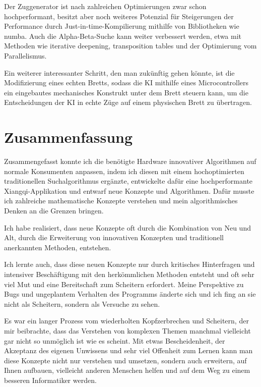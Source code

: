\documentclass{jpp}
\begin{document}
Der Zuggenerator ist nach zahlreichen Optimierungen zwar schon hochperformant, besitzt aber noch weiteres Potenzial für Steigerungen der Performance durch Just-in-time-Kompilierung mithilfe von Bibliotheken wie numba. Auch die Alpha-Beta-Suche kann weiter verbessert werden, etwa mit Methoden wie iterative deepening, transposition tables und der Optimierung vom Parallelismus.

Ein weiterer interessanter Schritt, den man zukünftig gehen könnte, ist die Modifizierung eines echten Bretts, sodass die KI mithilfe eines Microcontrollers ein eingebautes mechanisches Konstrukt unter dem Brett steuern kann, um die Entscheidungen der KI in echte Züge auf einem physischen Brett zu übertragen.

\section{Zusammenfassung}
Zusammengefasst konnte ich die benötigte Hardware innovativer Algorithmen auf normale Konsumenten anpassen, indem ich diesen mit einem hochoptimierten traditionellen Suchalgorithmus ergänzte, entwickelte dafür eine hochperformante Xiangqi-Applikation und entwarf neue Konzepte und Algorithmen. Dafür musste ich zahlreiche mathematische Konzepte verstehen und mein algorithmisches Denken an die Grenzen bringen. 

Ich habe realisiert, dass neue Konzepte oft durch die Kombination von Neu und Alt, durch die Erweiterung von innovativen Konzepten und traditionell anerkannten Methoden, entstehen.

Ich lernte auch, dass diese neuen Konzepte nur durch kritisches Hinterfragen und intensiver Beschäftigung mit den herkömmlichen Methoden entsteht und oft sehr viel Mut und eine Bereitschaft zum Scheitern erfordert. Meine Perspektive zu Bugs und ungeplantem Verhalten des Programms änderte sich und ich fing an sie nicht als Scheitern, sondern als Versuche zu sehen.  

Es war ein langer Prozess vom wiederholten Kopfzerbrechen und Scheitern, der mir beibrachte, dass das Verstehen von komplexen Themen manchmal vielleicht gar nicht so unmöglich ist wie es scheint. Mit etwas Bescheidenheit, der Akzeptanz des eigenen Unwissens und sehr viel Offenheit zum Lernen kann man diese Konzepte nicht nur verstehen und umsetzen, sondern auch erweitern, auf Ihnen aufbauen, vielleicht anderen Menschen helfen und auf dem Weg zu einem besseren Informatiker werden.

\newpage
\end{document}
